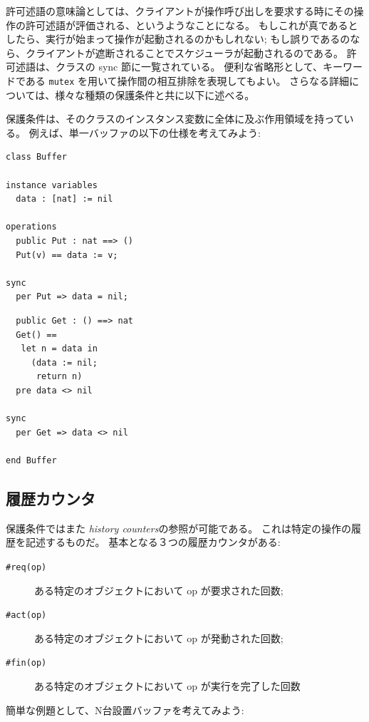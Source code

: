 \documentclass[\pformat,12pt]{jreport}
\begin{document}
許可述語の意味論としては、クライアントが操作呼び出しを要求する時にその操作の許可述語が評価される、というようなことになる。
もしこれが真であるとしたら、実行が始まって操作が起動されるのかもしれない; もし誤りであるのなら、クライアントが遮断されることでスケジューラが起動されるのである。
許可述語は、クラスの sync 節に一覧されている。
便利な省略形として、キーワードである \texttt{mutex} を用いて操作間の相互排除を表現してもよい。
さらなる詳細については、様々な種類の保護条件と共に以下に述べる。

保護条件は、そのクラスのインスタンス変数に全体に及ぶ作用領域を持っている。
例えば、単一バッファの以下の仕様を考えてみよう:
\newpage

\begin{multicols}{2}
\begin{lstlisting}
class Buffer

instance variables
  data : [nat] := nil

operations
  public Put : nat ==> ()
  Put(v) == data := v;

sync
  per Put => data = nil;
\end{lstlisting}
\begin{lstlisting}
  public Get : () ==> nat
  Get() ==
   let n = data in
     (data := nil;
      return n)
  pre data <> nil

sync
  per Get => data <> nil

end Buffer
\end{lstlisting}
\end{multicols}

\subsection{履歴カウンタ}

保護条件ではまた \emph{history counters}の参照が可能である。
これは特定の操作の履歴を記述するものだ。
基本となる３つの履歴カウンタがある:

\begin{description}
\item[\texttt{\#req(op)}] ある特定のオブジェクトにおいて op が要求された回数;
\item[\texttt{\#act(op)}] ある特定のオブジェクトにおいて op が発動された回数;
\item[\texttt{\#fin(op)}] ある特定のオブジェクトにおいて op が実行を完了した回数\end{description}

簡単な例題として、N台設置バッファを考えてみよう:
\end{document}
